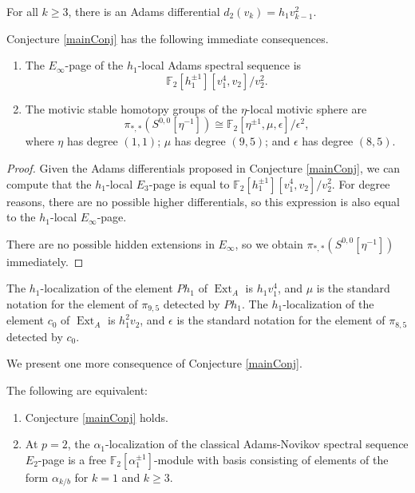 \documentclass[10pt]{amsart}
\begin{document}
\begin{conj}\label{mainConj}
For all $k \geq 3$, there is an Adams differential
$d_2 (v_k ) = h_1 v_{k-1}^2$.
\end{conj}

Conjecture \ref{mainConj} has the following immediate consequences.

\begin{conj}
\label{mainConj2}
\mbox{}
\begin{enumerate}
\item
The $E_\infty$-page of the $h_1$-local Adams spectral sequence is
\[ {\ensuremath{\mathbb{F}}}_2[h_1^{\pm 1}][v_1^4,v_2]/v_2^2.\]
\item
The motivic stable homotopy groups of the $\eta$-local motivic sphere
are
\[
\pi_{*,*}(S^{0,0}[\eta^{-1}]) {\cong} {\ensuremath{\mathbb{F}}}_2[\eta^{\pm 1},\mu,\epsilon]/\epsilon^2,
\]
where $\eta$ has degree $(1,1)$;
$\mu$ has degree $(9,5)$;
and $\epsilon$ has degree $(8,5)$.
\end{enumerate}
\end{conj}

\begin{proof}
Given the Adams differentials proposed in Conjecture \ref{mainConj},
we can compute that the $h_1$-local $E_3$-page
is equal to 
${\ensuremath{\mathbb{F}}}_2[h_1^{\pm 1}][v_1^4,v_2]/v_2^2$.
For degree reasons, there are no possible higher differentials,
so this expression is also equal to the $h_1$-local $E_\infty$-page.

There are no possible hidden extensions in $E_\infty$, so we obtain
$\pi_{*,*}(S^{0,0}[\eta^{-1}])$ immediately.
\end{proof}

\begin{rmk}
The $h_1$-localization of the element $Ph_1$ of $\operatorname{Ext}_A$ is $h_1 v_1^4$,
and $\mu$ is the standard notation for the element of $\pi_{9,5}$
detected by $P h_1$.
The $h_1$-localization of the element $c_0$ of $\operatorname{Ext}_A$ is $h_1^2 v_2$,
and $\epsilon$ is the standard notation for the element of $\pi_{8,5}$
detected by $c_0$.
\end{rmk}

We present one more consequence of Conjecture \ref{mainConj}.

\begin{thm}
\label{thmANSS}
The following are equivalent:
\begin{enumerate}
\item
Conjecture \ref{mainConj} holds.
\item
At $p=2$, the $\alpha_1$-localization of the classical Adams-Novikov spectral
sequence $E_2$-page is a free ${\ensuremath{\mathbb{F}}}_2 [\alpha_1^{\pm 1}]$-module 
with basis consisting of elements of the form $\alpha_{k/b}$
for $k = 1$ and $k \geq 3$.
\end{enumerate}
\end{thm}
\end{document}
